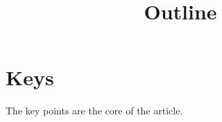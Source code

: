 \documentclass[12pt]{article}
\begin{document}
\title{Outline}
\author{}
\date{\vspace{-10ex}}
\maketitle

\section{Keys}

The key points are the core of the article.
%
\end{document}
